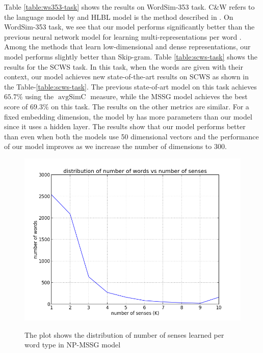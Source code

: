 \documentclass[11pt,a4paper]{article}
\DeclareMathOperator*{\avgSimC}{avgSimC}
\begin{document}
Table \ref{table:ws353-task} shows the results on WordSim-353
task. C\&W refers to the language model by 
and HLBL model is the method described in .  On
WordSim-353 task, we see that our model performs significantly better
than the previous neural network model for learning multi-representations
per word \cite{huang:2012}. Among the methods that learn
low-dimensional and dense representations, our model performs slightly
better than Skip-gram.
Table \ref{table:scws-task} shows the results for the SCWS task. In
this task, when the words are given with their context, our model
achieves new state-of-the-art results on SCWS as shown in the
Table-\ref{table:scws-task}. The previous state-of-art model
\cite{huang:2012} on this task achieves $65.7\%$ using the $\avgSimC$
measure, while the MSSG model achieves the best score of $69.3\%$ on this
task. The results on the other metrics are similar. For a fixed embedding dimension, the model by  has more parameters than our model since it uses a hidden layer. The results show that our model performs better than  even when both the models use 50 dimensional vectors and the performance of our model improves as we increase the number of dimensions to 300.  
\begin{figure}
\includegraphics[scale=0.3]{images/np_mssg_graph.png}
\label{fig:np-mssg-sense-dist} 
\caption{The plot shows the distribution of number of senses learned per word type in NP-MSSG model}
\end{figure}
\end{document}
